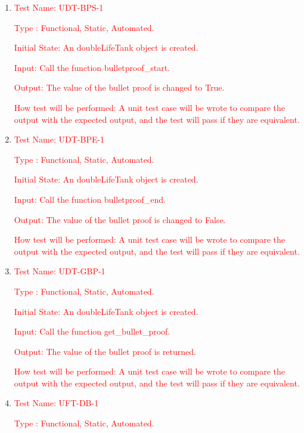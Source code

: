 \documentclass[12pt, titlepage]{article}
\begin{document}
\begin{enumerate}
\item{\textcolor{red}{Test Name: UDT-BPS-1}}

\textcolor{red}{Type : Functional, Static, Automated.}

\textcolor{red}{Initial State: An doubleLifeTank object is created.}

\textcolor{red}{Input: Call the function bulletproof\_start.}

\textcolor{red}{Output: The value of the bullet proof is changed to True.}

\textcolor{red}{How test will be performed: A unit test case will be wrote to compare the output with the expected output, and the test will pass if they are equivalent.}\\

\item{\textcolor{red}{Test Name: UDT-BPE-1}}

\textcolor{red}{Type : Functional, Static, Automated.}

\textcolor{red}{Initial State: An doubleLifeTank object is created.}

\textcolor{red}{Input: Call the function bulletproof\_end.}

\textcolor{red}{Output: The value of the bullet proof is changed to False.}

\textcolor{red}{How test will be performed: A unit test case will be wrote to compare the output with the expected output, and the test will pass if they are equivalent.}\\

\item{\textcolor{red}{Test Name: UDT-GBP-1}}

\textcolor{red}{Type : Functional, Static, Automated.}

\textcolor{red}{Initial State: An doubleLifeTank object is created.}

\textcolor{red}{Input: Call the function get\_bullet\_proof.}

\textcolor{red}{Output: The value of the bullet proof is returned.}

\textcolor{red}{How test will be performed: A unit test case will be wrote to compare the output with the expected output, and the test will pass if they are equivalent.}\\

\item{\textcolor{red}{Test Name: UFT-DB-1}}

\textcolor{red}{Type : Functional, Static, Automated.}


\end{enumerate}
\end{document}

